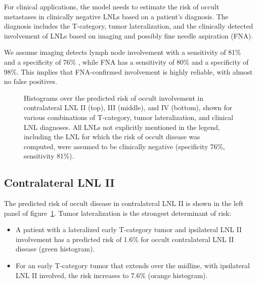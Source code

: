 \documentclass[
  sn-mathphys-num,
]{sn-jnl}
\providecommand{\tightlist}{%
  \setlength{\itemsep}{0pt}\setlength{\parskip}{0pt}}\usepackage{longtable,booktabs,array}
\begin{document}
For clinical applications, the model needs to estimate the risk of
occult metastases in clinically negative LNLs based on a patient's
diagnosis. The diagnosis includes the T-category, tumor lateralization,
and the clinically detected involvement of LNLs based on imaging and
possibly fine needle aspiration (FNA).

We assume imaging detects lymph node involvement with a sensitivity of
81\% and a specificity of 76\% \citep{debondt_detection_2007}, while FNA
has a sensitivity of 80\% and a specificity of 98\%. This implies that
FNA-confirmed involvement is highly reliable, with almost no false
positives.

\begin{figure}


\caption{\label{fig-model-risks}Histograms over the predicted risk of
occult involvement in contralateral LNL II (top), III (middle), and IV
(bottom), shown for various combinations of T-category, tumor
lateralization, and clinical LNL diagnoses. All LNLs not explicitly
mentioned in the legend, including the LNL for which the risk of occult
disease was computed, were assumed to be clinically negative
(specificity 76\%, sensitivity 81\%).}

\end{figure}%

\subsection{Contralateral LNL II}\label{contralateral-lnl-ii}

The predicted risk of occult disease in contralateral LNL II is shown in
the left panel of figure~\ref{fig-model-risks}. Tumor lateralization is
the strongest determinant of risk:

\begin{itemize}
\tightlist
\item
  A patient with a lateralized early T-category tumor and ipsilateral
  LNL II involvement has a predicted risk of 1.6\% for occult
  contralateral LNL II disease (green histogram).\\
\item
  For an early T-category tumor that extends over the midline, with
  ipsilateral LNL II involved, the risk increases to 7.6\% (orange
  histogram).
\end{itemize}
\end{document}
